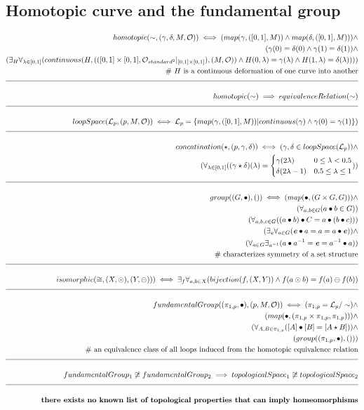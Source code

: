 \documentclass[a4paper]{article}
\newcommand{\eqComment}[1]{\text{  \# #1}}
\newcommand{\n}{\\[1.5ex] \hline \nonumber \\[0ex]}
\newcommand{\m}{\nonumber \\}
\newcommand{\field}[1]{\textbf{\textit{#1}}}
\begin{document}
\subsection{Homotopic curve and the fundamental group}
\begin{tcolorbox}
\begin{align}
   homotopic(\sim, (\gamma, \delta, M, \mathcal{O})) \iff (map(\gamma, ([0, 1], M)) \land map(\delta, ([0, 1], M))) \land 
\m (\gamma(0) = \delta(0) \land \gamma(1) = \delta(1)) \land
\m (\exists_H \forall_{\lambda \in [0, 1]} (continuous(H, (([0, 1] \times [0, 1], \mathcal{O}_{standard^2}|_{[0, 1] \times [0, 1]}), (M, \mathcal{O})) \land H(0, \lambda) = \gamma(\lambda) \land H(1, \lambda) = \delta(\lambda))))
\m \eqComment{$H$ is a continuous deformation of one curve into another}
\n homotopic(\sim) \implies equivalenceRelation(\sim)
\n loopSpace(\mathcal{L}_p, (p, M, \mathcal{O})) \iff \mathcal{L}_p = \{map(\gamma, ([0, 1], M))| continuous(\gamma) \land \gamma(0) = \gamma(1)\})
\n concatination(\star, (p, \gamma, \delta)) \iff (\gamma, \delta \in loopSpace(\mathcal{L}_p)) \land
\m (\forall_{\lambda \in [0, 1]} ((\gamma \star \delta) (\lambda) = \begin{cases} \gamma(2 \lambda) & 0 \leq \lambda < 0.5 \\ \delta(2 \lambda - 1) & 0.5 \leq \lambda \leq 1 \end{cases}))
\n group((G, \bullet), ()) \iff (map(\bullet, (G \times G, G))) \land
\m (\forall_{a, b \in G} (a \bullet b \in G))
\m (\forall_{a, b, c \in G} ((a \bullet b) \bullet C = a \bullet (b \bullet c)))
\m (\exists_\field{e} \forall_{a \in G} (\field{e} \bullet a = a = a \bullet \field{e})) \land
\m (\forall_{a \in G} \exists_{a^{-1}} (a \bullet a^{-1} = \field{e} = a^{-1} \bullet a))
\m \eqComment{characterizes symmetry of a set structure}
\n isomorphic(\cong, (X, \odot), (Y, \ominus))) \iff \exists_f \forall_{a, b \in X} (bijection(f, (X, Y)) \land f(a \odot b) = f(a) \ominus f(b))
\n fundamentalGroup((\pi_{1, p}, \bullet), (p, M, \mathcal{O})) \iff (\pi_{1, p} = \mathcal{L}_p / \sim) \land
\m (map(\bullet, (\pi_{1, p} \times \pi_{1, p}, \pi_{1, p}))) \land
\m (\forall_{A, B \in \pi_{1, p}} ([A] \bullet [B] = [A \star B])) \land
\m (group((\pi_{1, p}, \bullet), ()))
\m \eqComment{an equivalence class of all loops induced from the homotopic equivalence relation}
\n fundamentalGroup_1 \centernot\cong fundamentalGroup_2 \implies topologicalSpace_1 \centernot\cong topologicalSpace_2
\n \textbf{there exists no known list of topological properties that can imply homeomorphisms}
\end {align}
\end{tcolorbox}
\end{document}

